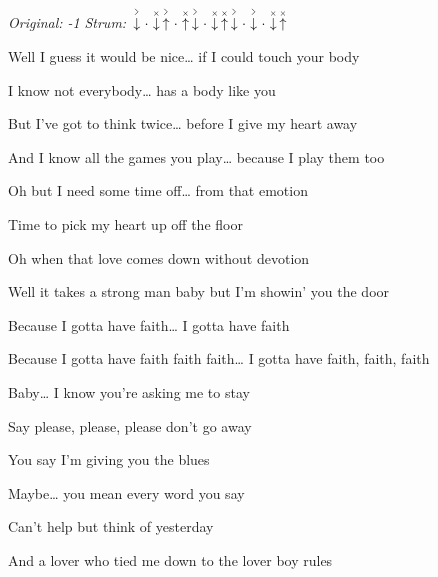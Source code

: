 \begin{song}


\begin{headerbox}
\RaiseBoxWithAccents
\textit{Original: -1} \quad
\textit{Strum:} $\AccentDown\Miss\ChuckDown\AccentUp\Miss\ChuckUp\AccentDown\Miss \ChuckDown\ChuckUp\AccentDown\Miss\AccentDown\Miss\ChuckDown\ChuckUp$
\end{headerbox}

\begin{hchordbox}
\end{hchordbox}

\Large

\bigskip

Well I guess it would be nice… if I could touch your body \par
I know not everybody… has a body like you \par
But I’ve got to think twice… before I give my heart away \par
And I know all the games you play… because I play them too \par

\bigskip

Oh but I need some time off… from that emotion \par
{}Time to pick my heart up off the floor \par
Oh when that love comes down without devotion \par
Well it takes a strong man baby but I’m showin’ you the door \par

\bigskip

Because I gotta have faith… I gotta have faith \par
Because I gotta have faith faith faith… I gotta have faith, faith, faith \par

\bigskip

Baby… I know you’re asking me to stay \par
Say please, please, please don’t go away \par
You say I’m giving you the blues \par
Maybe… you mean every word you say \par
Can’t help but think of yesterday \par
And a lover who tied me down to the lover boy rules \par


\end{song}
